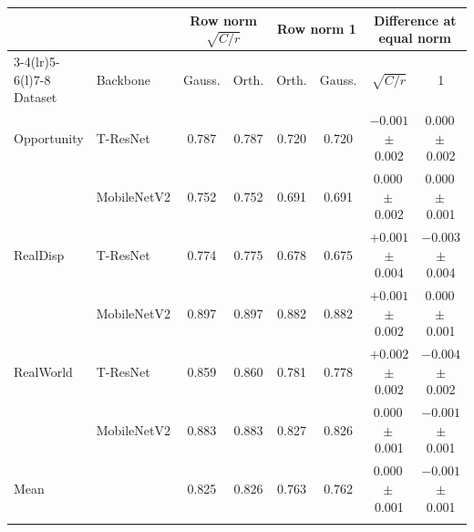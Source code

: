 \begin{tabular}{@{}ll cc cc cc@{}}
\toprule
 & & \multicolumn{2}{c}{Row norm $\sqrt{C/r}$} & \multicolumn{2}{c}{Row norm 1} & \multicolumn{2}{c}{Difference at equal norm} \\
\cmidrule(lr){3-4}\cmidrule(lr){5-6}\cmidrule(l){7-8}
Dataset & Backbone & Gauss. & Orth. & Orth. & Gauss. & $\sqrt{C/r}$ & 1 \\
\midrule
Opportunity & T-ResNet & 0.787 & 0.787 & 0.720 & 0.720 & $-0.001$\,{\scriptsize$\pm$\,0.002} & $0.000$\,{\scriptsize$\pm$\,0.002} \\
 & MobileNetV2 & 0.752 & 0.752 & 0.691 & 0.691 & $0.000$\,{\scriptsize$\pm$\,0.002} & $0.000$\,{\scriptsize$\pm$\,0.001} \\
RealDisp & T-ResNet & 0.774 & 0.775 & 0.678 & 0.675 & $+0.001$\,{\scriptsize$\pm$\,0.004} & $-0.003$\,{\scriptsize$\pm$\,0.004} \\
 & MobileNetV2 & 0.897 & 0.897 & 0.882 & 0.882 & $+0.001$\,{\scriptsize$\pm$\,0.002} & $0.000$\,{\scriptsize$\pm$\,0.001} \\
RealWorld & T-ResNet & 0.859 & 0.860 & 0.781 & 0.778 & $+0.002$\,{\scriptsize$\pm$\,0.002} & $-0.004$\,{\scriptsize$\pm$\,0.002} \\
 & MobileNetV2 & 0.883 & 0.883 & 0.827 & 0.826 & $0.000$\,{\scriptsize$\pm$\,0.001} & $-0.001$\,{\scriptsize$\pm$\,0.001} \\
\midrule
Mean &  & 0.825 & 0.826 & 0.763 & 0.762 & $0.000$\,{\scriptsize$\pm$\,0.001} & $-0.001$\,{\scriptsize$\pm$\,0.001} \\
\botrule
\end{tabular}
